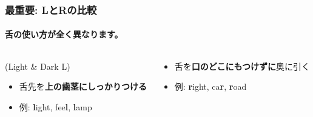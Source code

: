 \documentclass[aspectratio=169,xcolor={dvipsnames,table}]{beamer}
\begin{document}
\begin{frame}
    \frametitle{最重要: LとRの比較}
    \framesubtitle{舌の使い方が全く異なります。}
     \begin{columns}[T,totalwidth=\textwidth]
        \begin{column}{.45\textwidth}
            \begin{block}{ (Light \& Dark L)}
                \begin{itemize}
                    \item 舌先を\textbf{上の歯茎にしっかりつける}
                    \item 例: \textbf{l}ight, fee\textbf{l}, \textbf{l}amp
                \end{itemize}
            \end{block}
        \end{column}
        \begin{column}{.45\textwidth}
            \begin{block}{}
                \begin{itemize}
                    \item 舌を\textbf{口のどこにもつけずに}奥に引く
                    \item 例: \textbf{r}ight, ca\textbf{r}, \textbf{r}oad
                \end{itemize}
            \end{block}
        \end{column}
    \end{columns}
\end{frame}
\end{document}
